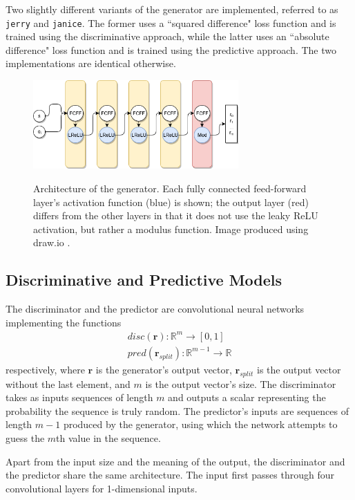 \documentclass[12pt, titlepage]{report}
\theoremstyle{definition}
\begin{document}
Two slightly different variants of the generator are implemented, referred to as \texttt{jerry} and \texttt{janice}. The former uses a ``squared difference" loss function and is trained using the discriminative approach, while the latter uses an ``absolute difference" loss function and is trained using the predictive approach. The two implementations are identical otherwise.

\begin{figure}
\centering
\includegraphics[width=0.7\textwidth]{img/generator.png}\\
\caption{Architecture of the generator. Each fully connected feed-forward layer's activation function (blue) is shown; the output layer (red) differs from the other layers in that it does not use the leaky ReLU activation, but rather a modulus function. Image produced using draw.io \cite{jgraph2018draw}.}
\label{figure:architecture_generator}
\end{figure}




\subsection{Discriminative and Predictive Models}
The discriminator and the predictor are convolutional neural networks implementing the functions
\begin{gather}
disc(\bm{r}) : \mathbb{R}^m \rightarrow [0, 1] \\
pred(\bm{r}_{split}) : \mathbb{R}^{m - 1} \rightarrow \mathbb{R}
\end{gather}
respectively, where $\bm{r}$ is the generator's output vector, $\bm{r}_{split}$ is the output vector without the last element, and $m$ is the output vector's size. The discriminator takes as inputs sequences of length $m$ and outputs a scalar representing the probability the sequence is truly random. The predictor's inputs are sequences of length $m-1$ produced by the generator, using which the network attempts to guess the $m$th value in the sequence.

Apart from the input size and the meaning of the output, the discriminator and the predictor share the same architecture. The input first passes through four convolutional layers for 1-dimensional inputs.
\end{document}
